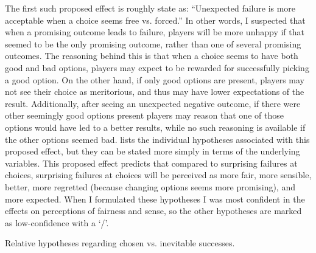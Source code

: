 The first such proposed effect is roughly state as: ``Unexpected failure is more acceptable when a choice seems free vs. forced.''
%
In other words, I suspected that when a promising outcome leads to failure, players will be more unhappy if that seemed to be the only promising outcome, rather than one of several promising outcomes.
%
The reasoning behind this is that when a choice seems to have both good and bad options, players may expect to be rewarded for successfully picking a good option.
%
On the other hand, if only good options are present, players may not see their choice as meritorious, and thus may have lower expectations of the result.
%
Additionally, after seeing an unexpected negative outcome, if there were other seemingly good options present players may reason that one of those options would have led to a better results, while no such reasoning is available if the other options seemed bad.
%
 lists the individual hypotheses associated with this proposed effect, but they can be stated more simply in terms of the underlying variables.
%
This proposed effect predicts that compared to surprising failures at \obv{} choices, surprising failures at  choices will be perceived as more fair, more sensible, better, more regretted (because changing options seems more promising), and more expected.
%
When I formulated these hypotheses I was most confident in the effects on perceptions of fairness and sense, so the other hypotheses are marked as low-confidence with a `\lc/'.


\begin{table}[!h]
\centering
\bgroup
\def\arraystretch{1.3}
\setlength{\tabcolsep}{0.6em}

\egroup
\caption[Retrospective chosen vs. inevitable success hypotheses]{Relative hypotheses regarding chosen vs. inevitable successes.}
  \label{tab:e2-chosen-vs-inevitable-success-hypotheses}
\end{table}


